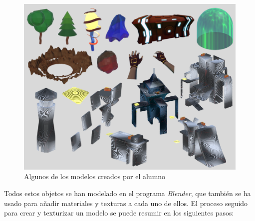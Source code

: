 \begin{figure}[h]
	\centering
	\includegraphics[scale=0.45]{img/3dmodels.png}
	\caption{Algunos de los modelos creados por el alumno}
	\label{fig:Modelos3D}
    \end{figure}
Todos estos objetos se han modelado en el programa \textit{Blender}, que también se ha usado para añadir materiales y texturas a cada uno de ellos. El proceso seguido para crear y texturizar un modelo se puede resumir en los siguientes pasos:
